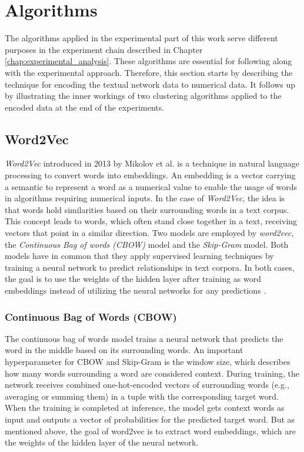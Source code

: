 \section{Algorithms}
The algorithms applied in the experimental part of this work serve different purposes in the experiment chain described in Chapter \ref{chap:experimental_analysis}. These algorithms are essential for following along with the experimental approach. Therefore, this section starts by describing the technique for encoding the textual network data to numerical data. It follows up by illustrating the inner workings of two clustering algorithms applied to the encoded data at the end of the experiments.


\subsection{Word2Vec}
\emph{Word2Vec} introduced in 2013 by Mikolov et al. is a technique in natural language processing to convert words into embeddings. An embedding is a vector carrying a semantic to represent a word as a numerical value to enable the usage of words in algorithms requiring numerical inputs. In the case of \emph{Word2Vec}, the idea is that words hold similarities based on their surrounding words in a text corpus. This concept leads to words, which often stand close together in a text, receiving vectors that point in a similar direction. Two models are employed by \emph{word2vec}, the \emph{Continuous Bag of words (CBOW)} model and the \emph{Skip-Gram} model. Both models have in common that they apply supervised learning techniques by training a neural network to predict relationships in text corpora. In both cases, the goal is to use the weights of the hidden layer after training as word embeddings instead of utilizing the neural networks for any predictions \cite{mikolov2013efficient} \cite{rong2014word2vec}.

\subsubsection{Continuous Bag of Words (CBOW)}
The continuous bag of words model trains a neural network that predicts the word in the middle based on its surrounding words. An important hyperparameter for CBOW and Skip-Gram is the window size, which describes how many words surrounding a word are considered context. 
During training, the network receives combined one-hot-encoded vectors of surrounding words (e.g., averaging or summing them) in a tuple with the corresponding target word. When the training is completed at inference, the model gets context words as input and outputs a vector of probabilities for the predicted target word. But as mentioned above, the goal of word2vec is to extract word embeddings, which are the weights of the hidden layer of the neural network.

